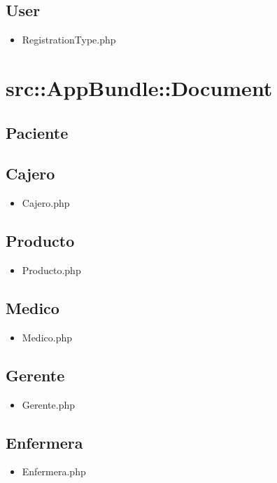 		\subsection{User}
		\begin{itemize}
		\item RegistrationType.php
		\end{itemize}
	\newpage	
	\section{src::AppBundle::Document}
	
	\subsection{Paciente}
		\subsection{Cajero}
		\begin{itemize}
			\item Cajero.php
		\end{itemize}				
		
		\subsection{Producto}
		\begin{itemize}
			\item Producto.php
		\end{itemize}				
		
		\subsection{Medico}
		\begin{itemize}
			\item Medico.php
		\end{itemize}				
		
		\subsection{Gerente}
		\begin{itemize}
			\item Gerente.php
		\end{itemize}				
		
		\subsection{Enfermera}
		\begin{itemize}
			\item Enfermera.php
		\end{itemize}				
		
